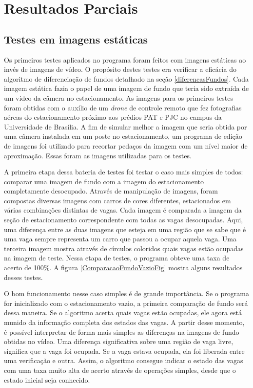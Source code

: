 \chapter{Resultados Parciais}\label{resultados}

\section{Testes em imagens estáticas} \label{testesEstaticas}

Os primeiros testes aplicados no programa foram feitos com imagens estáticas ao invés de imagens de vídeo. O propósito destes testes era verificar a eficácia do algoritmo de diferenciação de fundos detalhado na seção \ref{diferencasFundos}. Cada imagem estática fazia o papel de uma imagem de fundo que teria sido extraída de um vídeo da câmera no estacionamento. As imagens para os primeiros testes foram obtidas com o auxílio de um \textit{drone} de controle remoto que fez fotografias aéreas do estacionamento próximo aos prédios PAT e PJC no campus da Universidade de Brasília. A fim de simular melhor a imagem que seria obtida por uma câmera instalada em um poste no estacionamento, um programa de edição de imagens foi utilizado para recortar pedaços da imagem com um nível maior de aproximação. Essas foram as imagens utilizadas para os testes.

A primeira etapa dessa bateria de testes foi testar o caso mais simples de todos: comparar uma imagem de fundo com a imagem do estacionamento completamente desocupado. Através de manipulação de imagens, foram compostas diversas imagens com carros de cores diferentes, estacionados em várias combinações distintas de vagas. Cada imagem é comparada a imagem da seção de estacionamento correspondente com todas as vagas desocupadas. Aqui, uma diferença entre as duas imagens que esteja em uma região que se sabe que é uma vaga sempre representa um carro que passou a ocupar aquela vaga. Uma terceira imagem mostra através de círculos coloridos quais vagas estão ocupadas na imagem de teste.  Nessa etapa de testes, o programa obteve uma taxa de acerto de 100\%. A figura \ref{ComparacaoFundoVazioFig} mostra alguns resultados desses testes.

O bom funcionamento nesse caso simples é de grande importância. Se o programa for inicializado com o estacionamento vazio, a primeira comparação de fundo será dessa maneira. Se o algoritmo acerta quais vagas estão ocupadas, ele agora está munido da informação completa dos estados das vagas. A partir desse momento, é possível interpretar de forma mais simples as diferenças na imagens de fundo obtidas no vídeo. Uma diferença significativa sobre uma região de vaga livre, significa que a vaga foi ocupada. Se a vaga estava ocupada, ela foi liberada entre uma verificação e outra. Assim, o algoritmo consegue indicar o estado das vagas com uma taxa muito alta de acerto através de operações simples, desde que o estado inicial seja conhecido.

